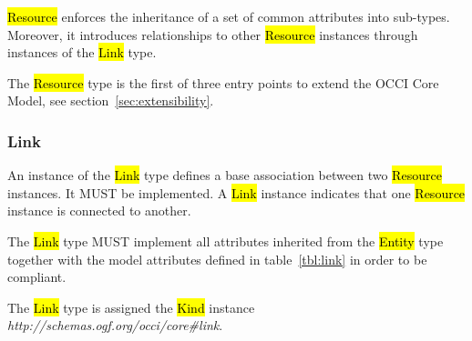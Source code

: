 \documentclass[10pt,a4paper]{article}
\begin{document}
\hl{Resource} enforces the inheritance of a set of common attributes
into sub-types. Moreover, it introduces relationships to other
\hl{Resource} instances through instances of the \hl{Link} type.

The \hl{Resource} type is the first of three entry points to extend
the OCCI Core Model, see section~\ref{sec:extensibility}.

\subsubsection{Link}
\label{sec:link}
An instance of the \hl{Link} type defines a base association between
two \hl{Resource} instances. It MUST be implemented. A \hl{Link}
instance indicates that one \hl{Resource} instance is connected to
another.

The \hl{Link} type MUST implement all attributes inherited from the
\hl{Entity} type together with the model attributes defined in
table~\ref{tbl:link} in order to be compliant.


The \hl{Link} type is assigned the \hl{Kind} instance
\textit{http://schemas.ogf.org/occi/core\#link}.

\end{document}
